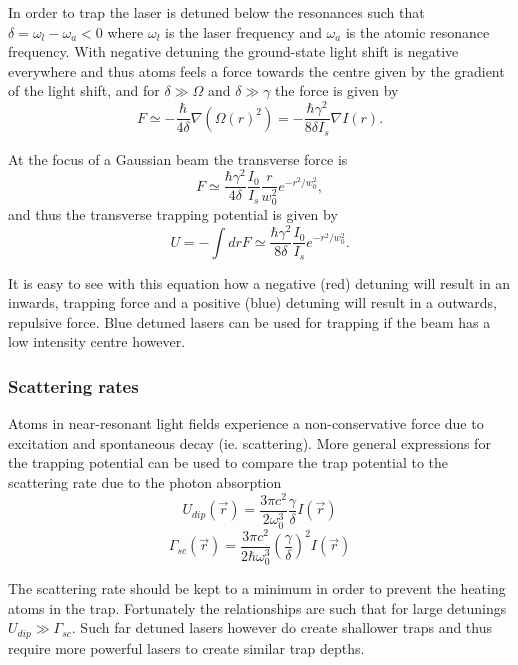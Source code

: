 In order to trap the laser is detuned below the resonances such that $\delta = \omega_l - \omega_a < 0$ where $\omega_l$ is the laser frequency and $\omega_a$ is the atomic resonance frequency. With negative detuning the ground-state light shift is negative everywhere and thus atoms feels a force towards the centre given by the gradient of the light shift, and for $\delta \gg \Omega$ and $\delta \gg \gamma$ the force is given by
\begin{equation}
F \simeq - \frac{\hbar}{4\delta} \nabla(\Omega(r)^2) = -\frac{\hbar \gamma^2}{8\delta I_s} \nabla I (r).
\end{equation}

At the focus of a Gaussian beam the transverse force is
\begin{equation}
F \simeq \frac{\hbar \gamma^2}{4 \delta} \frac{I_0}{I_s} \frac{r}{w_0^2} e^{-r^2/w_0^2},
\end{equation}
and thus the transverse trapping potential is given by
\begin{equation}
U = -\int dr F \simeq \frac{\hbar \gamma^2}{8\delta} \frac{I_0}{I_s} e^{-r^2/w_0^2}.
\end{equation}

It is easy to see with this equation how a negative (red) detuning will result in an inwards, trapping force and a positive (blue) detuning will result in a outwards, repulsive force. Blue detuned lasers can be used for trapping if the beam has a low intensity centre however\cite{davidson_long_1995, lee_raman_1996, ozeri_long_1999, friedman_compression_2000}.

\subsubsection{Scattering rates}
Atoms in near-resonant light fields experience a non-conservative force due to excitation and spontaneous decay (ie. scattering). More general expressions for the trapping potential can be used to compare the trap potential to the scattering rate due to the photon absorption\cite{grimm_optical_2000}
\begin{equation}
U_{dip}(\vec{r})=\frac{3\pi c^2}{2\omega_0^3} \frac{\gamma}{\delta} I(\vec{r})
\end{equation}
\begin{equation}
\Gamma_{sc}(\vec{r})=\frac{3\pi c^2}{2\hbar \omega_0^3}\left(\frac{\gamma}{\delta}\right)^2 I(\vec{r})
\end{equation}

The scattering rate should be kept to a minimum in order to prevent the heating atoms in the trap. Fortunately the relationships are such that for large detunings $U_{dip}\gg\Gamma_{sc}$. Such far detuned lasers however do create shallower traps and thus require more powerful lasers to create similar trap depths.

